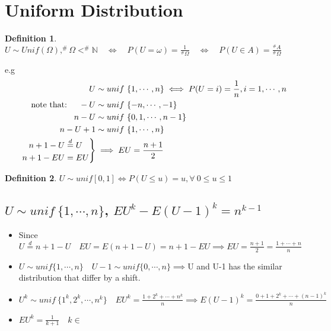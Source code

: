 \documentclass{article}
\theoremstyle{definition}
\newtheorem{definition}{Definition}[section]
\theoremstyle{thrm}
\theoremstyle{lma}
\theoremstyle{ppst}
\theoremstyle{crlr}
\newenvironment{rcases}
  {\left.\begin{aligned}}
  {\end{aligned}\right\rbrace}
\begin{document}
\section{Uniform Distribution}
\begin{definition}
	$U \sim Unif(\Omega),  ^{\#}\Omega <^{\#}\mathbb{N} \quad \iff \quad P(U=\omega) = \frac{1}{^{\#}\Omega}\quad \iff \quad P(U\in A) = \frac{^{\#}A}{^{\#}\Omega}$ 
\end{definition}
e.g 
\begin{align*}
	U &\sim unif \ \{1,\cdots, n\} \iff P(U=i)=\frac{1}{n}, i =1, \cdots, n \\ 
	\text{note that: }\quad -U &\sim unif \ \{-n,\cdots, -1\}\\
	n-U &\sim unif\ \{0,1,\cdots, n-1\}\\
	n-U+1 &\sim unif\ \{1,\cdots, n\}\\
	\begin{rcases}
    n+1-U &\stackrel{d}{=} U\\
    n+1-EU &= EU
	\end{rcases}&\implies EU = \frac{n+1}{2}
\end{align*}
\begin{definition}
	$U\sim unif[0,1] \iff P(U\leq u) = u,\forall\  0 \leq u\leq1$
\end{definition}
\subsection{$U \sim unif\  \{1,\cdots, n\}$, $EU^k-E(U-1)^k = n^{k-1}$}
\begin{itemize}
	\item Since $U \stackrel{d}{=} n+1-U\quad  EU=E(n+1-U) = n+1-EU \implies EU = \frac{n+1}{2} = \frac{1+\cdots+n}{n}$
	\item $U \sim unif \{1,\cdots, n\} \quad U-1 \sim unif \{0,\cdots, n\} \implies$U and U-1 has the similar distribution that differ by a shift.
	\item $U^k\sim unif\ \{1^k,2^k,\cdots, n^k\}\quad EU^k=\frac{1+2^k+\cdots+n^k}{n} \implies E(U-1)^k = \frac{0+1+2^k+\cdots+(n-1)^k}{n}$
	\item $EU^k = \frac{1}{k+1}\quad k \in $
\end{itemize}
\end{document}
